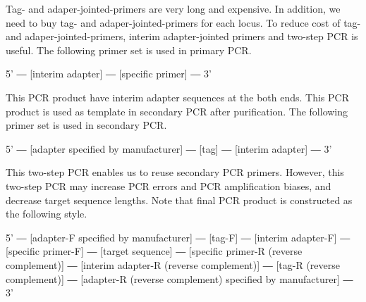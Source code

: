 \documentclass[titlepage,10pt,a4paper,english]{jsbook}
\newenvironment{pre}{\begin{leftbar}\raggedright\ttfamily\footnotesize\setlength{\baselineskip}{1.4em}}{\end{leftbar}\vspace{-1em}}
\begin{document}
Tag- and adaper-jointed-primers are very long and expensive.
In addition, we need to buy tag- and adaper-jointed-primers for each locus.
To reduce cost of tag- and adaper-jointed-primers, interim adapter-jointed primers and two-step PCR is useful.
The following primer set is used in primary PCR.

\begin{pre}
5' ― [interim adapter] ― [specific primer] ― 3'
\end{pre}

This PCR product have interim adapter sequences at the both ends.
This PCR product is used as template in secondary PCR after purification.
The following primer set is used in secondary PCR.

\begin{pre}
5' ― [adapter specified by manufacturer] ― [tag] ― [interim adapter] ― 3'
\end{pre}

This two-step PCR enables us to reuse secondary PCR primers.
However, this two-step PCR may increase PCR errors and PCR amplification biases, and decrease target sequence lengths.
Note that final PCR product is constructed as the following style.

\begin{pre}
5' ― [adapter-F specified by manufacturer] ― [tag-F] ― [interim adapter-F] ― [specific primer-F] ― [target sequence] ― [specific primer-R (reverse complement)] ― [interim adapter-R (reverse complement)] ― [tag-R (reverse complement)] ― [adapter-R (reverse complement) specified by manufacturer] ― 3'
\end{pre}
\end{document}
